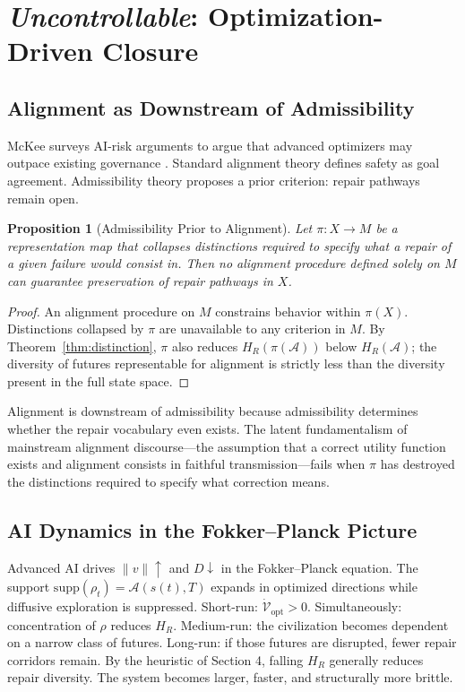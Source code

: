 \documentclass[12pt, a4paper]{article}
\theoremstyle{plain}
\newtheorem{proposition}{Proposition}
\theoremstyle{definition}
\theoremstyle{remark}
\begin{document}
\section{\textit{Uncontrollable}: Optimization-Driven Closure}

\subsection{Alignment as Downstream of Admissibility}

McKee surveys AI-risk arguments to argue that advanced optimizers may outpace existing governance \cite{mckee2024}. Standard alignment theory defines safety as goal agreement. Admissibility theory proposes a prior criterion: repair pathways remain open.

\begin{proposition}[Admissibility Prior to Alignment]
\label{prop:prior}
Let $\pi : X \to M$ be a representation map that collapses distinctions required to specify what a repair of a given failure would consist in. Then no alignment procedure defined solely on $M$ can guarantee preservation of repair pathways in $X$.
\end{proposition}

\begin{proof}
An alignment procedure on $M$ constrains behavior within $\pi(X)$. Distinctions collapsed by $\pi$ are unavailable to any criterion in $M$. By Theorem~\ref{thm:distinction}, $\pi$ also reduces $H_R(\pi(\mathcal{A}))$ below $H_R(\mathcal{A})$; the diversity of futures representable for alignment is strictly less than the diversity present in the full state space.
\end{proof}

Alignment is downstream of admissibility because admissibility determines whether the repair vocabulary even exists. The latent fundamentalism of mainstream alignment discourse---the assumption that a correct utility function exists and alignment consists in faithful transmission---fails when $\pi$ has destroyed the distinctions required to specify what correction means.

\subsection{AI Dynamics in the Fokker--Planck Picture}

Advanced AI drives $\|v\| \uparrow$ and $D \downarrow$ in the Fokker--Planck equation. The support $\mathrm{supp}(\rho_t) = \mathcal{A}(s(t),T)$ expands in optimized directions while diffusive exploration is suppressed. Short-run: $\dot{\mathcal{V}}_{\mathrm{opt}} > 0$. Simultaneously: concentration of $\rho$ reduces $H_R$. Medium-run: the civilization becomes dependent on a narrow class of futures. Long-run: if those futures are disrupted, fewer repair corridors remain. By the heuristic of Section 4, falling $H_R$ generally reduces repair diversity. The system becomes larger, faster, and structurally more brittle.
\end{document}
